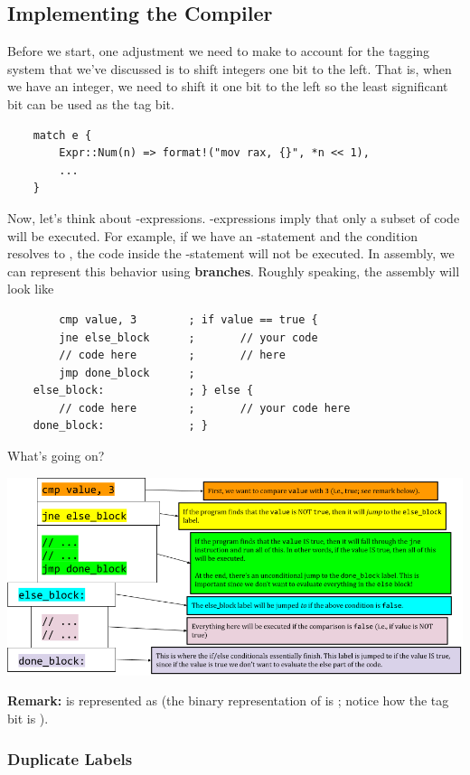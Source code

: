 \documentclass[letterpaper]{article}
\begin{document}
\subsection{Implementing the Compiler}
Before we start, one adjustment we need to make to account for the tagging system that we've discussed is to shift integers one bit to the left. That is, when we have an integer, we need to shift it one bit to the left so the least significant bit can be used as the tag bit.
\begin{verbatim}
    match e {
        Expr::Num(n) => format!("mov rax, {}", *n << 1),
        ... 
    }\end{verbatim}
Now, let's think about -expressions. -expressions imply that only a subset of code will be executed. For example, if we have an -statement and the condition resolves to , the code inside the -statement will not be executed. In assembly, we can represent this behavior using \textbf{branches}. Roughly speaking, the assembly will look like
\begin{verbatim}
        cmp value, 3        ; if value == true {
        jne else_block      ;       // your code
        // code here        ;       // here 
        jmp done_block      ; 
    else_block:             ; } else {
        // code here        ;       // your code here
    done_block:             ; }
\end{verbatim}
What's going on?  
\begin{center}
    \includegraphics[scale=0.5]{../assets/asm_if.png}
\end{center}
\textbf{Remark:}  is represented as  (the binary representation of  is ; notice how the tag bit is ).

\subsubsection{Duplicate Labels}
\end{document}
